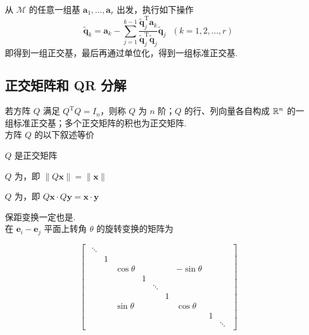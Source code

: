 \documentclass[./main.tex]{subfiles}
\begin{document}
从 $\mathcal{M}$ 的任意一组基 $\bm{a}_1,\dots,\bm{a}_r$ 出发，执行如下操作
\begin{equation}
    \bm{\widetilde{q}}_k=\bm{a}_k-\sum_{j=1}^{k-1}\frac{\bm{\widetilde{q}}_j^{\mathrm{T}}\bm{a}_k}{\bm{\widetilde{q}}_j^{\mathrm{T}}\bm{\widetilde{q}}_j}\bm{\widetilde{q}}_j \ \ \ (k=1,2,\dots,r)
\end{equation}
即得到一组正交基，最后再通过单位化，得到一组标准正交基.

\subsection{正交矩阵和 QR 分解}

若方阵 $Q$ 满足 $Q^{\mathrm{T}}Q=I_n$，则称 $Q$ 为 $n$ 阶；$Q$ 的行、列向量各自构成 $\mathbb{R}^{n}$ 的一组标准正交基；多个正交矩阵的积也为正交矩阵. \\

方阵 $Q$ 的以下叙述等价
\begin{enumerate*}
    \item $Q$ 是正交矩阵
    \item $Q$ 为，即 $\|Q\bm{x}\|=\|\bm{x}\|$
    \item $Q$ 为，即 $Q\bm{x}\cdot Q\bm{y}=\bm{x}\cdot\bm{y}$
\end{enumerate*}
保距变换一定也是. \\

在 $\bm{e}_i-\bm{e}_j$ 平面上转角 $\theta$ 的旋转变换的矩阵为

\begin{equation}
    \begin{bmatrix}
        \begin{smallmatrix}
            \ddots &&&&&&&&\\
            &1&&&&&&&\\
            &&\cos\theta&&&&-\sin\theta&&\\
            &&&1&&&&&\\
            &&&&\ddots &&&&\\
            &&&&&1&&&\\
            &&\sin\theta&&&&\cos\theta&&\\
            &&&&&&&1&\\
            &&&&&&&&\ddots
        \end{smallmatrix}
    \end{bmatrix}
\end{equation}
\end{document}

